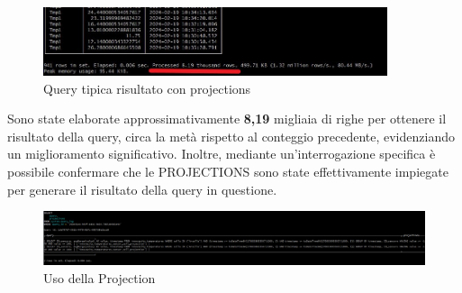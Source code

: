       \begin{figure}[H]
        \centering
        \includegraphics[width=0.9\textwidth]{../Images/SpecificaTecnica/ConProjectionRisultato.jpg}
        \caption{Query tipica risultato con projections}
        \label{fig:ProjectionsQueryWith}
      \end{figure}   
  Sono state elaborate approssimativamente \textbf{8,19} migliaia di righe per ottenere il risultato della query, circa la metà rispetto al conteggio precedente, evidenziando un miglioramento significativo. Inoltre, mediante un'interrogazione specifica è possibile confermare che le PROJECTIONS sono state effettivamente impiegate per generare il risultato della query in questione.
\begin{figure}[H]
    \centering
    \includegraphics[width=1\textwidth]{../Images/SpecificaTecnica/ProjectionUsedByClickHouse.jpg}
    \caption{Uso della Projection}
    \label{fig:ProjectionsUsed}
\end{figure}

